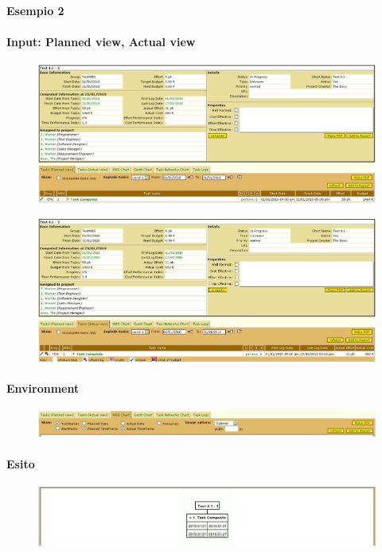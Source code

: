 \paragraph{Esempio 2}
\paragraph{Input: Planned view, Actual view}
\begin{figure}
\centering
\includegraphics[width=\textwidth]{tests/TEST_WBS/4.1/4.1_3/Esempio_2/input.png}
\end{figure}
\begin{figure}
\centering
\includegraphics[width=\textwidth]{tests/TEST_WBS/4.1/4.1_3/Esempio_2/input_actual.png}
\end{figure}

\paragraph{Environment}
\begin{figure}
\centering
\includegraphics[width=\textwidth]{tests/TEST_WBS/4.1/4.1_3/Esempio_2/environment.png}
\end{figure}

\paragraph{Esito}
\begin{figure}
\centering
\includegraphics[width=\textwidth]{tests/TEST_WBS/4.1/4.1_3/Esempio_2/output.png}
\end{figure}
\newpage


